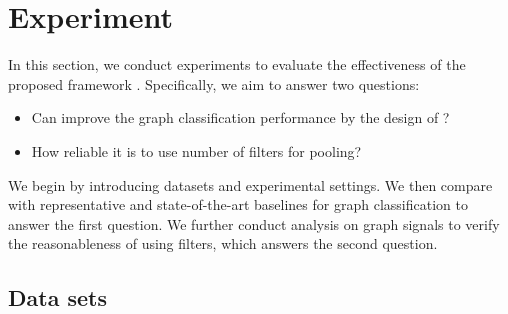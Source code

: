 \documentclass[sigconf]{acmart}
\begin{document}
 \section{Experiment} \label{sec:experimental_results}
In this section, we conduct experiments to evaluate the effectiveness of the proposed framework . Specifically, we aim to answer two questions:
\begin{itemize}
    \item Can  improve the graph classification performance by the design of ?
    \item How reliable it is to use  number of filters for pooling?
\end{itemize}
We begin by introducing datasets and experimental settings. We then compare  with representative and state-of-the-art baselines for graph classification to answer the first question. We further conduct analysis on graph signals to verify the reasonableness of using  filters, which answers the second question. 



\subsection{Data sets}
\end{document}
